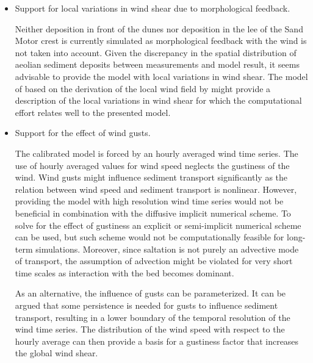 \begin{itemize}
\item Support for local variations in wind shear due to morphological
  feedback.

  Neither deposition in front of the dunes nor deposition in the lee
  of the Sand Motor crest is currently simulated as morphological
  feedback with the wind is not taken into account. Given the
  discrepancy in the spatial distribution of aeolian sediment deposits
  between measurements and model result, it seems advisable to provide
  the model with local variations in wind shear. The model of
  \cite{Kroy2002} based on the derivation of the local wind field by
  \citet{Weng1991} might provide a description of the local variations
  in wind shear for which the computational effort relates well to the
  presented model.

%

\item Support for the effect of wind gusts.

  The calibrated model is forced by an hourly averaged wind time
  series. The use of hourly averaged values for wind speed neglects
  the gustiness of the wind. Wind gusts might influence sediment
  transport significantly as the relation between wind speed and
  sediment transport is nonlinear. However, providing the model with
  high resolution wind time series would not be beneficial in
  combination with the diffusive implicit numerical scheme. To solve
  for the effect of gustiness an explicit or semi-implicit numerical
  scheme can be used, but such scheme would not be computationally
  feasible for long-term simulations. Moreover, since saltation is not
  purely an advective mode of transport, the assumption of advection
  might be violated for very short time scales as interaction with the
  bed becomes dominant.

  As an alternative, the influence of gusts can be parameterized. It
  can be argued that some persistence is needed for gusts to influence
  sediment transport, resulting in a lower boundary of the temporal
  resolution of the wind time series. The distribution of the wind
  speed with respect to the hourly average can then provide a basis
  for a gustiness factor that increases the global wind shear.


\end{itemize}
